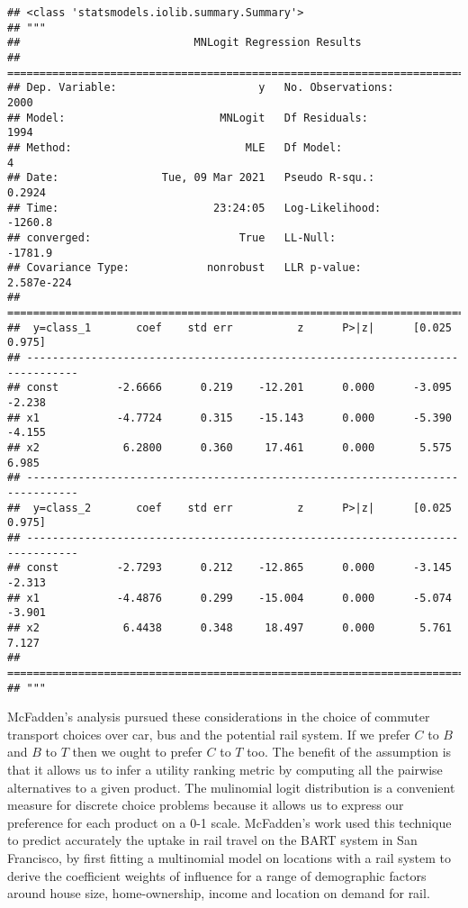 \documentclass[
]{book}
\theoremstyle{definition}
\theoremstyle{definition}
\theoremstyle{definition}
\theoremstyle{remark}
\begin{document}
\begin{verbatim}
## <class 'statsmodels.iolib.summary.Summary'>
## """
##                           MNLogit Regression Results                          
## ==============================================================================
## Dep. Variable:                      y   No. Observations:                 2000
## Model:                        MNLogit   Df Residuals:                     1994
## Method:                           MLE   Df Model:                            4
## Date:                Tue, 09 Mar 2021   Pseudo R-squ.:                  0.2924
## Time:                        23:24:05   Log-Likelihood:                -1260.8
## converged:                       True   LL-Null:                       -1781.9
## Covariance Type:            nonrobust   LLR p-value:                2.587e-224
## ==============================================================================
##  y=class_1       coef    std err          z      P>|z|      [0.025      0.975]
## ------------------------------------------------------------------------------
## const         -2.6666      0.219    -12.201      0.000      -3.095      -2.238
## x1            -4.7724      0.315    -15.143      0.000      -5.390      -4.155
## x2             6.2800      0.360     17.461      0.000       5.575       6.985
## ------------------------------------------------------------------------------
##  y=class_2       coef    std err          z      P>|z|      [0.025      0.975]
## ------------------------------------------------------------------------------
## const         -2.7293      0.212    -12.865      0.000      -3.145      -2.313
## x1            -4.4876      0.299    -15.004      0.000      -5.074      -3.901
## x2             6.4438      0.348     18.497      0.000       5.761       7.127
## ==============================================================================
## """
\end{verbatim}

McFadden's analysis pursued these considerations in the choice of commuter transport choices over car, bus and the potential rail system. If we prefer \(C\) to \(B\) and \(B\) to \(T\) then we ought to prefer \(C\) to \(T\) too. The benefit of the assumption is that it allows us to infer a utility ranking metric by computing all the pairwise alternatives to a given product. The mulinomial logit distribution is a convenient measure for discrete choice problems because it allows us to express our preference for each product on a 0-1 scale. McFadden's work used this technique to predict accurately the uptake in rail travel on the BART system in San Francisco, by first fitting a multinomial model on locations with a rail system to derive the coefficient weights of influence for a range of demographic factors around house size, home-ownership, income and location on demand for rail.
\end{document}
